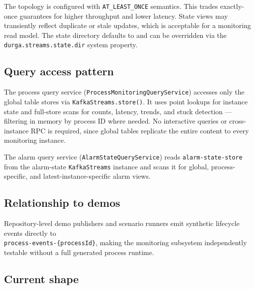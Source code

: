 The topology is configured with \texttt{AT\_LEAST\_ONCE} semantics. This trades
exactly-once guarantees for higher throughput and lower latency. State views may
transiently reflect duplicate or stale updates, which is acceptable for a monitoring
read model. The state directory defaults to 
and can be overridden via the \texttt{durga.streams.state.dir} system property.

\subsection{Query access pattern}

The process query service (\texttt{ProcessMonitoringQueryService}) accesses only the global
table stores via \texttt{KafkaStreams.store()}. It uses point lookups for instance
state and full-store scans for counts, latency, trends, and stuck detection — filtering
in memory by process ID where needed. No interactive queries or cross-instance RPC is
required, since global tables replicate the entire content to every monitoring instance.

The alarm query service (\texttt{AlarmStateQueryService}) reads
\texttt{alarm-state-store} from the alarm-state \texttt{KafkaStreams} instance and
scans it for global, process-specific, and latest-instance-specific alarm views.

\subsection{Relationship to demos}

Repository-level demo publishers and scenario runners emit synthetic lifecycle
events directly to \\ \texttt{process-events-\{processId\}}, making the monitoring subsystem
independently testable without a full generated process runtime.

\subsection{Current shape}

